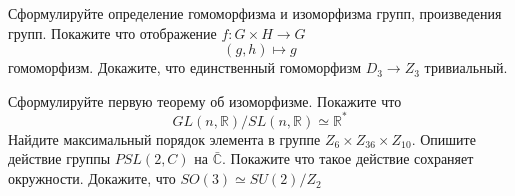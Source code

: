 \documentclass[a5paper, landscape]{exam}
\begin{document}
	\firstpageheadrule
\vspace*{0.5cm}
\vspace*{0.5cm}
\begin{questions}

\question Сформулируйте определение гомоморфизма и изоморфизма групп, произведения групп. Покажите что отображение $f: G \times H \to G $\[(g,h) \mapsto g\]  гомоморфизм. Докажите, что единственный гомоморфизм $D_3 \to Z_3$ тривиальный.

\question Сформулируйте первую теорему об изоморфизме. Покажите что \[
 GL(n,\mathbb{R})/SL(n,\mathbb{R}) \simeq \mathbb{R}^*
\]
\question Найдите максимальный порядок элемента в группе $Z_6 \times Z_{36} \times Z_{10}$.
\question Опишите действие группы $PSL(2,C)$ на $\bar{\mathbb{C}}$. Покажите что такое действие сохраняет окружности.
\question Докажите, что $SO(3) \simeq SU(2) / Z_2$
\end{questions}
\end{document}
